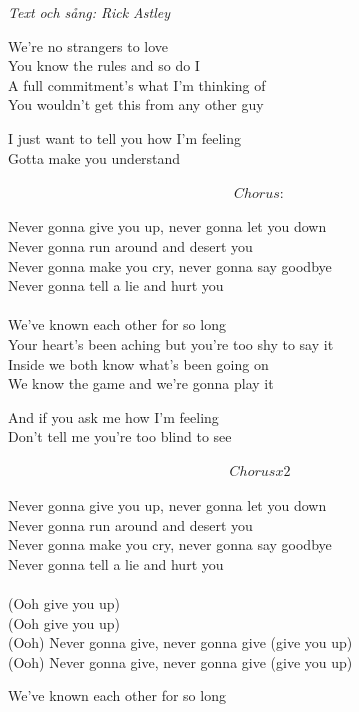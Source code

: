 {\footnotesize\textit{Text och sång: Rick Astley}}\par
\vspace{10pt}
We're no strangers to love\\
You know the rules and so do I\\
A full commitment's what I'm thinking of\\
You wouldn't get this from any other guy\par
\vspace{10pt}
I just want to tell you how I'm feeling\\
Gotta make you understand\\
\\
\[Chorus:\]\\
Never gonna give you up, never gonna let you down\\
Never gonna run around and desert you\\
Never gonna make you cry, never gonna say goodbye\\
Never gonna tell a lie and hurt you\\
\\
We've known each other for so long\\
Your heart's been aching but you're too shy to say it\\
Inside we both know what's been going on\\
We know the game and we're gonna play it\par
\vspace{10pt}
And if you ask me how I'm feeling \\
Don't tell me you're too blind to see\\
\\
\[Chorus x2\]\\
Never gonna give you up, never gonna let you down\\
Never gonna run around and desert you\\
Never gonna make you cry, never gonna say goodbye\\
Never gonna tell a lie and hurt you\\
\\
(Ooh give you up)\\
(Ooh give you up)\\
(Ooh) Never gonna give, never gonna give (give you up)\\
(Ooh) Never gonna give, never gonna give (give you up)\par
\vspace{10pt}
We've known each other for so long\\
